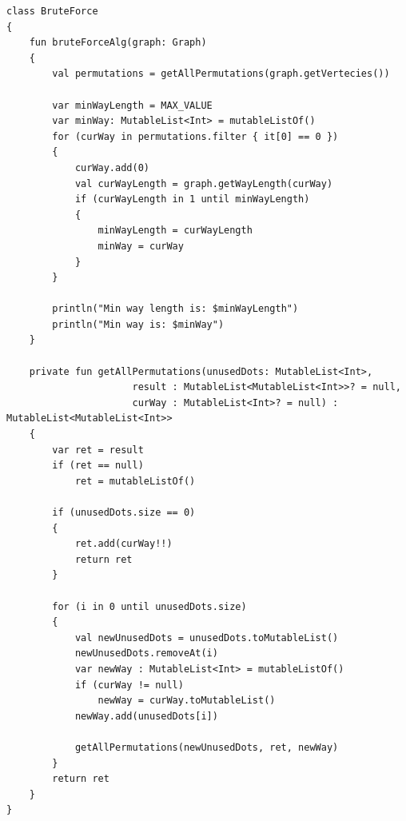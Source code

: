 \documentclass[12pt]{report}
\begin{document}
\begin{lstlisting}[caption=Класс реализации алгоритма полного перебора для решения задачи коммивояжера,
label={list:BruteForce}]
class BruteForce
{
    fun bruteForceAlg(graph: Graph)
    {
        val permutations = getAllPermutations(graph.getVertecies())

        var minWayLength = MAX_VALUE
        var minWay: MutableList<Int> = mutableListOf()
        for (curWay in permutations.filter { it[0] == 0 })
        {
            curWay.add(0)
            val curWayLength = graph.getWayLength(curWay)
            if (curWayLength in 1 until minWayLength)
            {
                minWayLength = curWayLength
                minWay = curWay
            }
        }

        println("Min way length is: $minWayLength")
        println("Min way is: $minWay")
    }

    private fun getAllPermutations(unusedDots: MutableList<Int>,
                      result : MutableList<MutableList<Int>>? = null,
                      curWay : MutableList<Int>? = null) : MutableList<MutableList<Int>>
    {
        var ret = result
        if (ret == null)
            ret = mutableListOf()

        if (unusedDots.size == 0)
        {
            ret.add(curWay!!)
            return ret
        }

        for (i in 0 until unusedDots.size)
        {
            val newUnusedDots = unusedDots.toMutableList()
            newUnusedDots.removeAt(i)
            var newWay : MutableList<Int> = mutableListOf()
            if (curWay != null)
                newWay = curWay.toMutableList()
            newWay.add(unusedDots[i])

            getAllPermutations(newUnusedDots, ret, newWay)
        }
        return ret
    }
}
\end{lstlisting}
\end{document}

